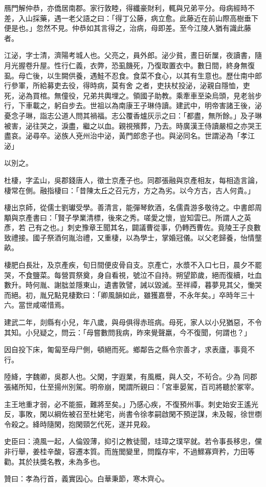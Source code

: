\begin{pinyinscope}
 鴈門解仲恭，亦僑居南郡。家行敦睦，得纖豪財利，輒與兄弟平分。母病經時不差，入山採藥，遇一老父語之曰：「得丁公藤，病立愈。此藤近在前山際高樹垂下便是也。」忽然不見。仲恭如其言得之，治病，母即差。至今江陵人猶有識此藤者。



 江泌，字士清，濟陽考城人也。父亮之，員外郎。泌少貧，晝日斫屟，夜讀書，隨月光握卷升屋。性行仁義，衣弊，恐虱饑死，乃復取置衣中。數日間，終身無復虱。母亡後，以生闕供養，遇鮭不忍食。食菜不食心，以其有生意也。歷仕南中郎行參軍，所給募吏去役，得時病，莫有舍
 之者，吏扶杖投泌，泌親自隱恤，吏死，泌為買棺。無僮役，兄弟共輿埋之。領國子助教。乘牽車至染烏頭，見老翁步行，下車載之，躬自步去。世祖以為南康王子琳侍讀。建武中，明帝害諸王後，泌憂念子琳，詣志公道人問其禍福。志公覆香爐灰示之曰：「都盡，無所餘。」及子琳被害，泌往哭之，淚盡，繼之以血。親視殯葬，乃去。時廣漢王侍讀嚴桓之亦哭王盡哀。泌尋卒。泌族人兗州治中泌，黃門郎悆子也。與泌同名。世謂泌為「孝江泌」



 以別之。



 杜棲，字孟山，吳郡錢唐人，徵士京產子也。同郡張融與京產相友，每相造言論，棲常在側。融指棲曰：「昔陳太丘之召元方，方之為劣。以今方古，古人何貴。」



 棲出京師，從儒士劉瓛受學。善清言，能彈琴飲酒，名儒貴游多敬待之。中書郎周顒與京產書曰：「賢子學業清標，後來之秀。嗟愛之懷，豈知雲已。所謂人之英彥，若
 己有之也。」刺史豫章王聞其名，闢議曹從事，仍轉西曹佐。竟陵王子良數致禮接。國子祭酒何胤治禮，又重棲，以為學士，掌婚冠儀。以父老歸養，怡情壟畝。



 棲肥白長壯，及京產疾，旬日間便皮骨自支。京產亡，水漿不入口七日，晨夕不罷哭，不食鹽菜。每營買祭奠，身自看視，號泣不自持。朔望節歲，絕而復續，吐血數升。時何胤、謝朏並隱東山，遺書敦譬，誡以毀滅。至祥禫，暮夢見其父，慟哭而絕。初，胤兄點見棲歎曰：「卿風韻如此，雖獲嘉譽，不永年矣。」卒時年三十六。當世咸嗟惜焉。



 建武二年，剡縣有小兒，年八歲，與母俱得赤班病。母死，家人以小兒猶惡，不令其知。小兒疑之，問云：「母嘗數問我病，昨來覺聲羸，今不復聞，何謂也？」



 因自投下床，匍匐至母尸側，頓絕而死。鄉鄰告之縣令宗善才，求表廬，事竟不行。



 陸絳，字魏卿，吳郡人也。父閑，字遐業，有風概，與人交，不茍合。少為
 同郡張緒所知，仕至揚州別駕。明帝崩，閑謂所親曰：「宮車晏駕，百司將聽於冢宰。



 主王地重才弱，必不能振，難將至矣。」乃感心疾，不復預州事。刺史始安王遙光反，事敗，閑以綱佐被召至杜姥宅，尚書令徐孝嗣啟閑不預逆謀，未及報，徐世檦令殺之。絳時隨閑，抱閑頸乞代死，遂并見殺。



 史臣曰：澆風一起，人倫毀薄，抑引之教徒聞，珪璋之璞罕就。若令事長移忠，儻非行舉，姜桂辛酸，容遷本質。而旌閭變里，問餼存牢，不過鰥寡齊矜，力田等勸。其於扶獎名教，未為多也。



 贊曰：孝為行首，義實因心。白華秉節，寒木齊心。



\end{pinyinscope}